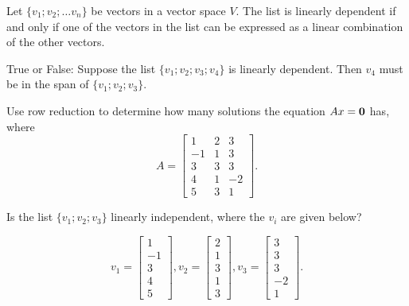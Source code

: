 \edXsolution{ 
}


\endedxproblem




\endedxvertical



Let $\{v_1; v_2; \ldots v_n\}$ be vectors in a vector space $V$.  The list is linearly dependent
if and only if one of the vectors in the list can be expressed as a linear combination of the other 
vectors.  

\endedxtext



True or False: Suppose the list $\{v_1; v_2; v_3; v_4\}$ is linearly dependent.  Then $v_4$ must be in the 
span of $\{v_1; v_2; v_3\}$.  



\edXsolution{ 
}


\endedxproblem

\endedxvertical






Use row reduction to determine how many solutions the equation $Ax = \mathbf{0}$ has, where 
\[ A = \left[\begin{array}{ccc} 1 & 2 & 3 \\ -1 & 1 & 3 \\ 3 & 3 & 3 \\ 4 & 1 & -2 \\
5  & 3 & 1 \end{array} \right]. \]




Is the list $\{v_1; v_2; v_3\}$ linearly independent, where the $v_i$ are given below?

\[v_1 = \left[\begin{array}{c} 1 \\ -1  \\ 3 \\ 4 \\5 \end{array} \right], 
v_2 = \left[\begin{array}{c} 2 \\ 1  \\ 3 \\ 1 \\ 3 \end{array} \right],  
v_3 = \left[\begin{array}{c} 3 \\ 3  \\ 3 \\ -2 \\ 1 \end{array} \right]. \]


